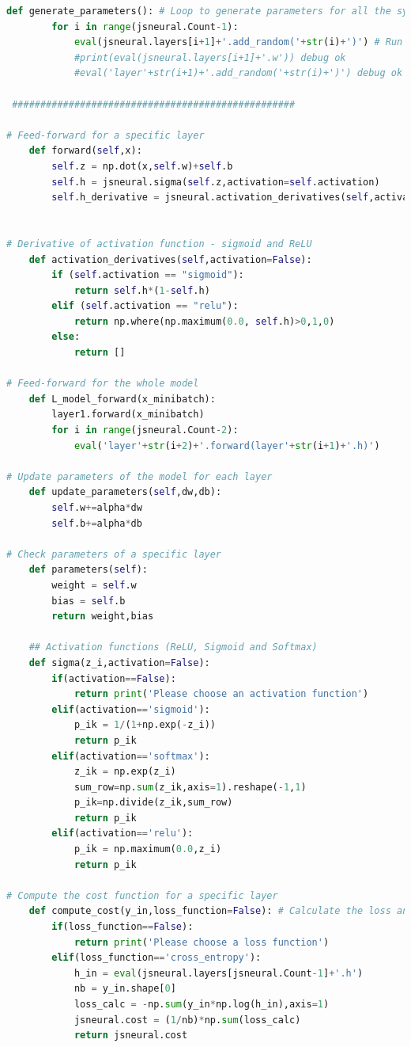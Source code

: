 \documentclass{article}
\begin{document}
\begin{lstlisting}[language=Python]
    def generate_parameters(): # Loop to generate parameters for all the systems
        for i in range(jsneural.Count-1):
            eval(jsneural.layers[i+1]+'.add_random('+str(i)+')') # Run over dictionary
            #print(eval(jsneural.layers[i+1]+'.w')) debug ok
            #eval('layer'+str(i+1)+'.add_random('+str(i)+')') debug ok
            
 ##################################################

# Feed-forward for a specific layer
    def forward(self,x):
        self.z = np.dot(x,self.w)+self.b
        self.h = jsneural.sigma(self.z,activation=self.activation)
        self.h_derivative = jsneural.activation_derivatives(self,activation=self.activation)


# Derivative of activation function - sigmoid and ReLU
    def activation_derivatives(self,activation=False):
        if (self.activation == "sigmoid"):
            return self.h*(1-self.h) 
        elif (self.activation == "relu"):
            return np.where(np.maximum(0.0, self.h)>0,1,0)    
        else:
            return []

# Feed-forward for the whole model             
    def L_model_forward(x_minibatch):
        layer1.forward(x_minibatch)
        for i in range(jsneural.Count-2):
            eval('layer'+str(i+2)+'.forward(layer'+str(i+1)+'.h)')

# Update parameters of the model for each layer       
    def update_parameters(self,dw,db):
        self.w+=alpha*dw
        self.b+=alpha*db

# Check parameters of a specific layer    
    def parameters(self):
        weight = self.w
        bias = self.b
        return weight,bias
    
    ## Activation functions (ReLU, Sigmoid and Softmax)
    def sigma(z_i,activation=False):
        if(activation==False):
            return print('Please choose an activation function')
        elif(activation=='sigmoid'):
            p_ik = 1/(1+np.exp(-z_i))
            return p_ik
        elif(activation=='softmax'):
            z_ik = np.exp(z_i)
            sum_row=np.sum(z_ik,axis=1).reshape(-1,1)
            p_ik=np.divide(z_ik,sum_row)
            return p_ik
        elif(activation=='relu'):
            p_ik = np.maximum(0.0,z_i)
            return p_ik

# Compute the cost function for a specific layer       
    def compute_cost(y_in,loss_function=False): # Calculate the loss and cost function using entering arrays
        if(loss_function==False):
            return print('Please choose a loss function')
        elif(loss_function=='cross_entropy'):
            h_in = eval(jsneural.layers[jsneural.Count-1]+'.h')
            nb = y_in.shape[0]
            loss_calc = -np.sum(y_in*np.log(h_in),axis=1)
            jsneural.cost = (1/nb)*np.sum(loss_calc)
            return jsneural.cost


\end{lstlisting}
\end{document}
